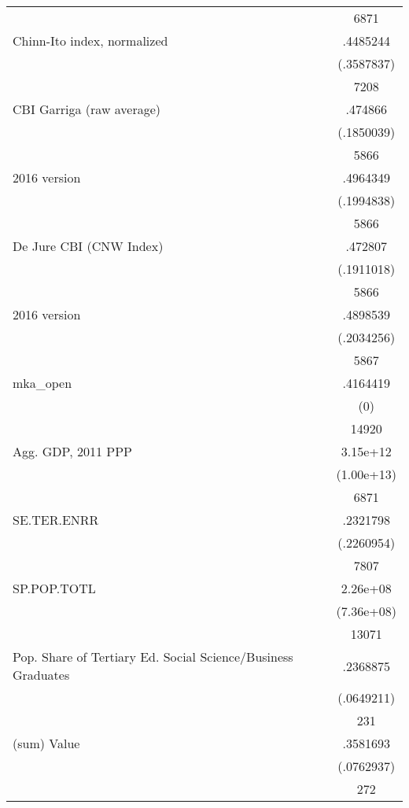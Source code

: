 {\begin{longtable}{l*{1}{c}}
                    &        6871\\
Chinn-Ito index, normalized&    .4485244\\
                    &  (.3587837)\\
                    &        7208\\
CBI Garriga (raw average)&     .474866\\
                    &  (.1850039)\\
                    &        5866\\
2016 version        &    .4964349\\
                    &  (.1994838)\\
                    &        5866\\
De Jure CBI (CNW Index)&     .472807\\
                    &  (.1911018)\\
                    &        5866\\
2016 version        &    .4898539\\
                    &  (.2034256)\\
                    &        5867\\
mka\_open            &    .4164419\\
                    &         (0)\\
                    &       14920\\
Agg. GDP, 2011 PPP  &    3.15e+12\\
                    &  (1.00e+13)\\
                    &        6871\\
SE.TER.ENRR         &    .2321798\\
                    &  (.2260954)\\
                    &        7807\\
SP.POP.TOTL         &    2.26e+08\\
                    &  (7.36e+08)\\
                    &       13071\\
Pop. Share of Tertiary Ed. Social Science/Business Graduates&    .2368875\\
                    &  (.0649211)\\
                    &         231\\
(sum) Value         &    .3581693\\
                    &  (.0762937)\\
                    &         272\\

\end{longtable}}
